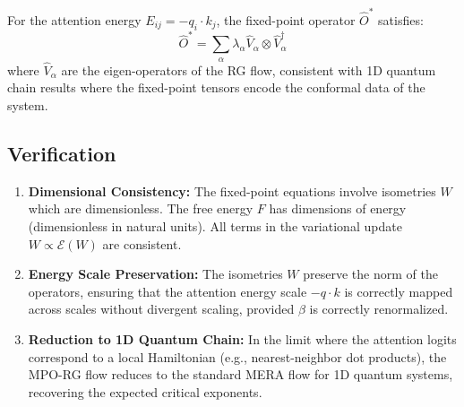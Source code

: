 For the attention energy $E_{ij} = -q_i \cdot k_j$, the fixed-point operator $\hat{O}^*$ satisfies:
\begin{equation}
    \hat{O}^* = \sum_{\alpha} \lambda_{\alpha} \hat{V}_{\alpha} \otimes \hat{V}_{\alpha}^\dagger
\end{equation}
where $\hat{V}_{\alpha}$ are the eigen-operators of the RG flow, consistent with 1D quantum chain results where the fixed-point tensors encode the conformal data of the system.

\subsection{Verification}

\begin{enumerate}
    \item \textbf{Dimensional Consistency:} The fixed-point equations involve isometries $W$ which are dimensionless. The free energy $F$ has dimensions of energy (dimensionless in natural units). All terms in the variational update $W \propto \mathcal{E}(W)$ are consistent.
    \item \textbf{Energy Scale Preservation:} The isometries $W$ preserve the norm of the operators, ensuring that the attention energy scale $-q \cdot k$ is correctly mapped across scales without divergent scaling, provided $\beta$ is correctly renormalized.
    \item \textbf{Reduction to 1D Quantum Chain:} In the limit where the attention logits correspond to a local Hamiltonian (e.g., nearest-neighbor dot products), the MPO-RG flow reduces to the standard MERA flow for 1D quantum systems, recovering the expected critical exponents.
\end{enumerate}
